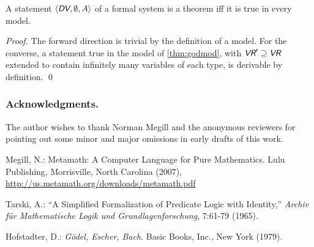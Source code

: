 \documentclass[runningheads,a4paper]{llncs}
\newcommand{\vr}{\textit{\textsf{VR}}} %
\newcommand{\dv}{\textit{\textsf{DV}}} %
\newcommand{\ang}[1]{\langle#1\rangle}
\begin{document}
\begin{corollary}
A statement $\ang{\dv,\emptyset,A}$ of a formal system is a theorem iff it is true in every model.
\end{corollary}
\begin{proof}
The forward direction is trivial by the definition of a model. For the converse, a statement true in the model of \autoref{thm:godmod}, with $\vr'\supseteq\vr$ extended to contain infinitely many variables of each type, is derivable by definition.
\qed\end{proof}

\subsubsection*{Acknowledgments.} The author wishes to thank Norman Megill and the anonymous reviewers for pointing out some minor and major omissions in early drafts of this work.

\begin{thebibliography}{4}

 Megill, N.: Metamath: A Computer Language for Pure Mathematics. Lulu Publishing, Morrisville, North Carolina (2007), \url{http://us.metamath.org/downloads/metamath.pdf}

 Tarski, A.: ``A Simplified Formalization of Predicate Logic with Identity,'' {\em Archiv f\"{u}r Mathematische Logik und Grundlagenforschung}, 7:61-79 (1965).

 Hofstadter, D.: {\em G\"{o}del, Escher, Bach}. Basic Books, Inc., New York (1979).
\end{thebibliography}
\end{document}
